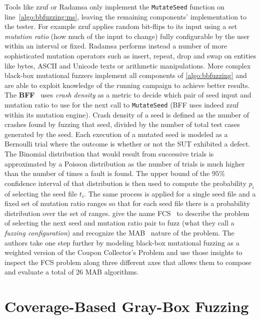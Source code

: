Tools like zzuf or Radamsa only implement the \texttt{MutateSeed} function on
line~\ref{algo:bbfuzzing:ms}, leaving the remaining components' implementation
to the tester. For example zzuf applies random bit-flips to its input using a
set \emph{mutation ratio} (how much of the input to change) fully configurable
by the user within an interval or fixed. Radamsa performs instead a number of
more sophisticated mutation operators such as insert, repeat, drop and swap on
entities like bytes, ASCII and Unicode texts or arithmetic manipulations. More
complex black-box mutational fuzzers implement all components of
\autoref{algo:bbfuzzing} and are able to exploit knowledge of the running
campaign to achieve better results.
The \textbf{\acf{BFF}}~\cite{householder2012probability} uses \emph{crash
density} as a metric to decide which pair of seed input and mutation ratio to
use for the next call to \texttt{MutateSeed} (\ac{BFF} uses indeed zzuf within
its mutation engine). Crash density of a seed is defined as the number of
crashes found by fuzzing that seed, divided by the number of total test cases
generated by the seed. Each execution of a mutated seed is modeled as a
Bernoulli trial where the outcome is whether or not the \ac{SUT} exhibited a
defect. The Binomial distribution that would result from successive trials is
approximated by a Poisson distribution as the number of trials is much higher
than the number of times a fault is found. The upper bound of the $95\%$
confidence interval of that distribution is then used to compute the probability
$p_i$ of selecting the seed file $t_i$. The same process is applied for a single
seed file and a fixed set of mutation ratio ranges so that for each seed file
there is a probability distribution over the set of ranges.
\citeauthor{woo2013scheduling} give the name \ac{FCS}~\cite{woo2013scheduling}
to describe the problem of selecting the next seed and mutation ratio pair to
fuzz (what they call a \emph{fuzzing configuration}) and recognize the
\ac{MAB}~\cite{berry1985bandit} nature of the problem. The authors take one step
further by modeling black-box mutational fuzzing as a weighted version of the
Coupon Collector's Problem and use those insights to inspect the \ac{FCS}
problem along three different axes that allows them to compose and evaluate a
total of 26 \ac{MAB} algorithms.

\section{Coverage-Based Gray-Box Fuzzing}
\label{sec:cgf}

